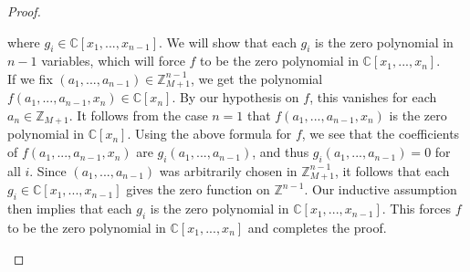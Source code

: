 \begin{proof}
\begin{enumerate}
        where $g_i\in \mathbb{C}[x_1,...,x_{n-1}]$. We will show that each $g_i$ is the zero polynomial in $n-1$ variables, which will force $f$ to be the zero polynomial in $\mathbb{C}[x_1,...,x_n]$.\\
        If we fix $(a_1,...,a_{n-1})\in \mathbb{Z}^{n-1}_{M+1}$, we get the polynomial $f(a_1,...,a_{n-1}, x_n)\in \mathbb{C}[x_n]$. By our hypothesis on $f$, this vanishes for each $a_n\in \mathbb{Z}_{M+1}$. It follows from the case $n=1$ that $f(a_1,...,a_{n-1},x_n)$ is the zero polynomial in $\mathbb{C}[x_n]$. Using the above formula for $f$, we see that the coefficients of $f(a_1,...,a_{n-1},x_n)$ are $g_i(a_1,...,a_{n-1})$, and thus $g_i(a_1,...,a_{n-1})=0$ for all $i$. Since $(a_1,...,a_{n-1})$ was arbitrarily chosen in $\mathbb{Z}^{n-1}_{M+1}$, it follows that each $g_i\in \mathbb{C}[x_1,...,x_{n-1}]$ gives the zero function on $\mathbb{Z}^{n-1}$. Our inductive assumption then implies that each $g_i$ is the zero polynomial in $\mathbb{C}[x_1,...,x_{n-1}]$. This forces $f$ to be the zero polynomial in $\mathbb{C}[x_1,...,x_n]$ and completes the proof.
    \end{enumerate}
\end{proof}
















